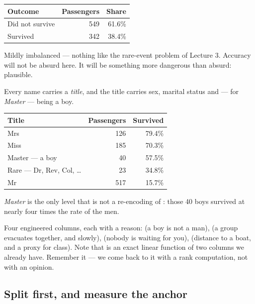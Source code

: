\documentclass[11pt,a4paper]{article}
\begin{document}
\begin{center}
\small
\begin{tabular}{lrr}
\toprule
\textbf{Outcome} & \textbf{Passengers} & \textbf{Share} \\
\midrule
Did not survive & 549 & 61.6\% \\
Survived        & 342 & 38.4\% \\
\bottomrule
\end{tabular}
\end{center}

Mildly imbalanced --- nothing like the rare-event problem of Lecture 3.
Accuracy will not be absurd here. It will be something more dangerous than
absurd: plausible.

Every name carries a \emph{title}, and the title carries sex, marital status
and --- for \emph{Master} --- being a boy.

\begin{center}
\small
\begin{tabular}{lrr}
\toprule
\textbf{Title} & \textbf{Passengers} & \textbf{Survived} \\
\midrule
Mrs                        & 126 & 79.4\% \\
Miss                       & 185 & 70.3\% \\
Master --- a boy           &  40 & 57.5\% \\
Rare --- Dr, Rev, Col, \ldots &  23 & 34.8\% \\
Mr                         & 517 & 15.7\% \\
\bottomrule
\end{tabular}
\end{center}

\emph{Master} is the only level that is not a re-encoding of : those
40 boys survived at nearly four times the rate of the men.

Four engineered columns, each with a reason:  (a boy is not a man),
 (a group evacuates together, and slowly), 
(nobody is waiting for you),  (distance to a boat, and a proxy for
class). Note that  is an exact linear
function of two columns we already have. Remember it --- we come back to it
with a rank computation, not with an opinion.

\subsection{Split first, and measure the anchor}
\end{document}
